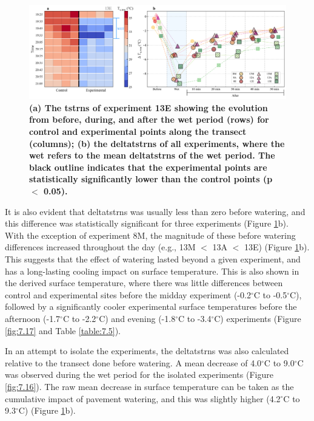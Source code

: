 \documentclass[final,3p,times,authoryear]{elsarticle}
\begin{document}
\begin{figure}
\centering \includegraphics[trim={0 0 0 0},clip,scale=0.45]{ts_transect_NEW.png}
\caption{\bf (a) The \gls{tstrns} of experiment 13E showing the evolution from before, during, and after the wet period (rows) for control and experimental points along the transect (columns); (b) the \gls{deltatstrns} of all experiments, where the wet refers to the mean \gls{deltatstrns} of the wet period. The black outline indicates that the experimental points are statistically significantly lower than the control points (\gls{p} $<$ 0.05).}
 \label{fig:3.5}
\end{figure}

It is also evident that \gls{deltatstrns} was usually less than zero before watering, and this difference was statistically significant for three experiments (Figure \ref{fig:3.5}b). With the exception of experiment 8M, the magnitude of these before watering differences increased throughout the day (e.g., 13M $<$ 13A $<$ 13E) (Figure \ref{fig:3.5}b). This suggests that the effect of watering lasted beyond a given experiment, and has a long-lasting cooling impact on surface temperature. This is also shown in the derived surface temperature, where there was little differences between control and experimental sites before the midday experiment (-0.2$^{\circ}$C to -0.5$^{\circ}$C), followed by a significantly cooler experimental surface temperatures before the afternoon (-1.7$^{\circ}$C to -2.2$^{\circ}$C) and evening (-1.8$^{\circ}$C to -3.4$^{\circ}$C) experiments (Figure \ref{fig:7.17} and Table \ref{table:7.5}).

In an attempt to isolate the experiments, the \gls{deltatstrns} was also calculated relative to the transect done before watering. A mean decrease of 4.0$^{\circ}$C to 9.0$^{\circ}$C was observed during the wet period for the isolated experiments (Figure \ref{fig:7.16}). The raw mean decrease in surface temperature can be taken as the cumulative impact of pavement watering, and this was slightly higher (4.2$^{\circ}$C to 9.3$^{\circ}$C) (Figure \ref{fig:3.5}b).
\end{document}
